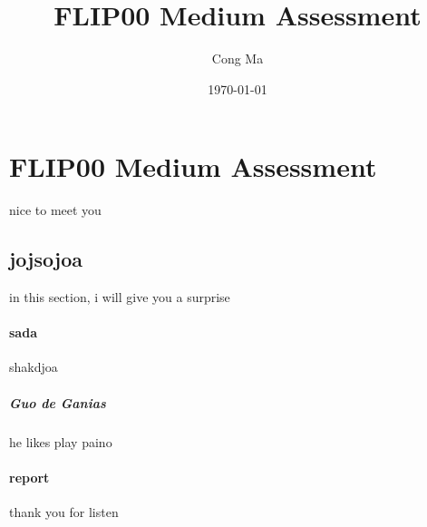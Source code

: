 \documentclass[UTF8]{cTexart}
\title{FLIP00 Medium Assessment}
\author{Cong Ma}
\date{\today}
\begin{document}
\maketitle
\section{FLIP00 Medium Assessment}
nice to meet you
\subsection{jojsojoa}
in this section, i will give you a surprise
\paragraph{sada}
shakdjoa
\subparagraph{Guo de Ganias}
he likes play paino
\paragraph{report} 
thank you for listen
\end{document}
